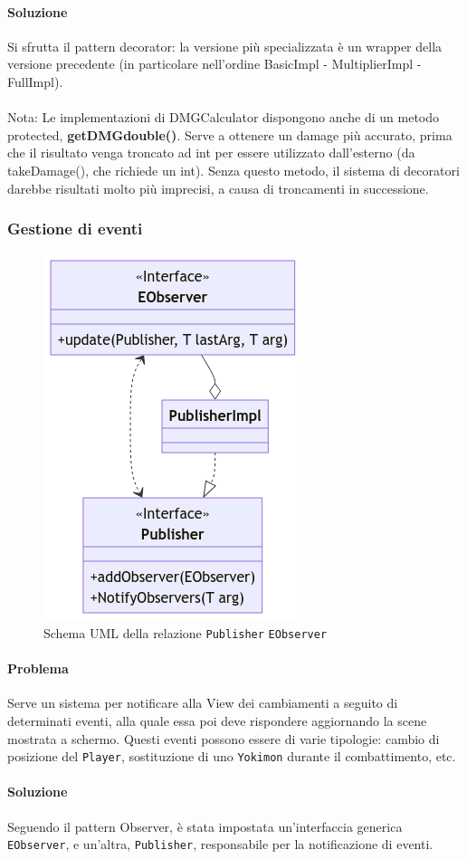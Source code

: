 \documentclass[a4paper,12pt]{report}
\begin{document}
\paragraph{Soluzione} Si sfrutta il pattern decorator: la versione più specializzata è un wrapper della versione precedente (in particolare nell’ordine BasicImpl - MultiplierImpl - FullImpl). \\
\footnotesize \\
Nota: Le implementazioni di DMGCalculator dispongono anche di un metodo protected, \textbf{getDMGdouble()}.
%
Serve a ottenere un damage più accurato, prima che il risultato venga troncato ad int per essere utilizzato dall’esterno (da takeDamage(), che richiede un int). Senza questo metodo, il sistema di decoratori darebbe risultati molto più imprecisi, a causa di troncamenti in successione.
\normalsize
\subsubsection{Gestione di eventi}
\begin{figure}[H]
\centering{}
\includegraphics[width=0.4\columnwidth]{images/uml-publisher.png}
\caption{Schema UML della relazione \texttt{Publisher} \texttt{EObserver}}
\label{img:uml-publisher}
\end{figure}
\paragraph{Problema} Serve un sistema per notificare alla View dei cambiamenti a seguito di determinati eventi, alla quale essa poi deve rispondere aggiornando la scene mostrata a schermo. 
%
Questi eventi possono essere di varie tipologie: cambio di posizione del \texttt{Player}, sostituzione di uno \texttt{Yokimon} durante il combattimento, etc.
\paragraph{Soluzione} Seguendo il pattern Observer, è stata impostata un’interfaccia generica \texttt{EObserver}, e un’altra, \texttt{Publisher}, responsabile per la notificazione di eventi.
\end{document}
